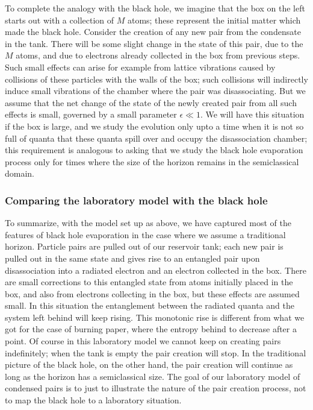 \documentclass[12pt]{article}
\begin{document}
To complete the analogy with the black hole, we imagine that the box on the left starts out with a collection of $M$ atoms; these represent the initial matter which made the black hole. Consider the creation of any new pair from the condensate in the tank. There will be some slight change in the state of this pair, due to the  $M$ atoms, and due to electrons already collected in the box from previous steps. Such small effects can arise for example from lattice vibrations caused by collisions of these particles with the walls of the box; such collisions will indirectly induce small vibrations of the chamber where the pair was disassociating. But we assume that the net change of the state of the newly created pair from all such effects is small, governed by a small parameter $\epsilon\ll 1$. We will have this situation if the box is large, and we study the evolution only upto a time when it is not so full of quanta that these quanta spill over and occupy the disassociation chamber; this requirement is analogous to asking that we study the black hole evaporation process only for times where the size of the horizon remains in the semiclassical domain. 



\subsubsection{Comparing the laboratory model with the black hole}

To summarize, with the model set up as above, we have captured most of the features of black hole evaporation in the case where we assume a traditional horizon. Particle pairs are pulled out of our reservoir tank; each new pair is pulled out in the same state and gives rise to an entangled pair upon disassociation into a radiated electron and an electron collected in the box. There are small corrections to this entangled state from atoms initially placed in the box, and also from electrons collecting in the box, but these effects are assumed small. In this situation the entanglement between the radiated quanta and the system left behind will keep rising. This monotonic rise is different from what we got for the case of burning paper, where the entropy behind to decrease after a point. Of course in this laboratory model we cannot keep on creating pairs indefinitely; when the tank is empty the pair creation will stop. In the traditional picture of the black hole, on the other hand, the pair creation will continue as long as the horizon has a semiclassical size. The goal of our laboratory model of condensed pairs
is to just to illustrate the nature of the pair creation process, not to map the black hole to a laboratory situation. 
\end{document}
